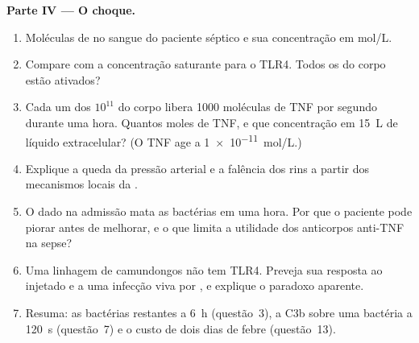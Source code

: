 \begin{problem}
\medskip
\noindent\textbf{Parte IV --- O choque.}
\begin{enumerate}[resume]
  \item Moléculas de  no sangue do paciente séptico e
        sua concentração em mol/L.
  \item Compare com a concentração saturante para o TLR4. Todos os
         do corpo estão ativados?
  \item Cada um dos $10^{11}$  do corpo libera \num{1000}
        moléculas de TNF por segundo durante uma hora. Quantos moles de
        TNF, e que concentração em \qty{15}{L} de líquido extracelular?
        (O TNF age a \qty{1e-11}{mol/L}.)
  \item Explique a queda da pressão arterial e a falência dos rins a
        partir dos mecanismos locais da .
  \item O  dado na admissão mata as bactérias em uma hora.
        Por que o paciente pode piorar antes de melhorar, e o que limita
        a utilidade dos anticorpos anti-TNF na sepse?
  \item Uma linhagem de camundongos não tem TLR4. Preveja sua resposta
        ao  injetado e a uma infecção viva por
        , e explique o paradoxo aparente.
  \item Resuma: as bactérias restantes a \qty{6}{h} (questão~3), a C3b
        sobre uma bactéria a \qty{120}{s} (questão~7) e o custo de dois
        dias de febre (questão~13).
\end{enumerate}
\end{problem}
